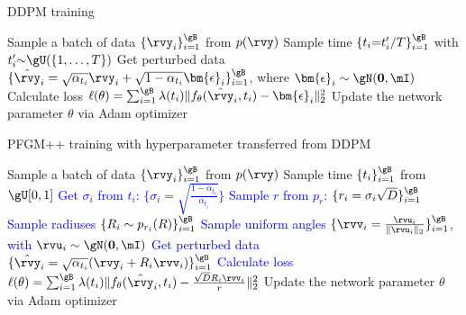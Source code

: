 \begin{minipage}{0.46\textwidth}
\vspace{-69pt}
\begin{algorithm}[H]
    \centering
    \caption{DDPM training}\label{algorithm-ddpm}
    \begin{algorithmic}[1]
        \STATE Sample a batch of data $\{\rvy_i\}_{i=1}^\gB$ from $p(\rvy)$
        \STATE Sample time $\{t_i{=}t_i'/T\}_{i=1}^\gB$ with $t_i'{\sim} \gU(\{1, \dots, T\})$ 
        \STATE Get perturbed data $\{\hat{\rvy}_i = \sqrt{\alpha_{t_i}}\rvy_i +\sqrt{1-\alpha_{t_i}}\bm{\epsilon}_i\}_{i=1}^\gB$,
        where $\bm{\epsilon}_i \sim \gN(\bf{0}, \mI)$
        \STATE Calculate loss $\ell(\theta) =  \sum_{i= 1}^\gB \lambda (t_i)\|f_\theta(\hat{\rvy}_i, t_i)-\bm{\epsilon}_i\|_2^2$
        \STATE Update the network parameter $\theta$ via Adam optimizer
    \end{algorithmic}
\end{algorithm}
\end{minipage}
\hfill
\begin{minipage}{0.50\textwidth}
\begin{algorithm}[H]
    \centering
    \caption{PFGM++ training with hyperparameter transferred from DDPM}\label{algorithm-ddpm-pfgmpp}
    \begin{algorithmic}[1]
        \STATE Sample a batch of data $\{\rvy_i\}_{i=1}^\gB$ from $p(\rvy)$
       \STATE Sample time $\{t_i\}_{i=1}^\gB$ from $\gU[0,1]$
       \STATE \textcolor{blue}{Get $\sigma_{i}$ from $t_i$: $\{\sigma_{i}=\sqrt{\frac{1-\alpha_{t_i}}{\alpha_{t_i}}}\}$}
        \STATE \textcolor{blue}{Sample $r$ from $p_r$: $\{r_i = \sigma_i\sqrt{D}\}_{i=1}^\gB$}
        \STATE  \textcolor{blue}{Sample radiuses $\{R_i \sim p_{r_i}(R)\}_{i=1}^\gB$}
        \STATE  \textcolor{blue}{Sample uniform angles $\{\rvv_i =\frac{\rvu_i}{\|\rvu_i\|_2}\}_{i=1}^\gB$, with $\rvu_i \sim \gN(\bf{0}, \mI)$}
        \STATE \textcolor{blue}{Get perturbed data $\{\hat{\rvy}_i = \sqrt{\alpha_{t_i}}(\rvy_i + R_i\rvv_i)\}_{i=1}^\gB$}
        \STATE \textcolor{blue}{Calculate loss $\ell(\theta) =  \sum_{i=1}^\gB \lambda (t_i)\|f_\theta(\hat{\rvy}_i, t_i)-\frac{\sqrt{D}R_i\rvv_i}{r}\|_2^2$}
        \STATE Update the network parameter $\theta$ via Adam optimizer
    \end{algorithmic}
\end{algorithm}
\end{minipage}

